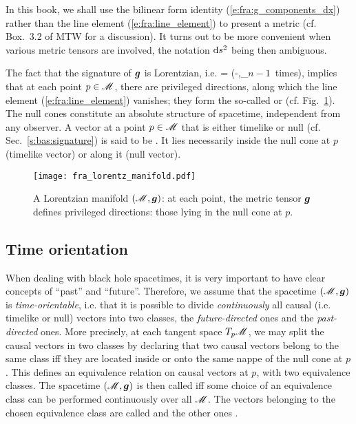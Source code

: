 \begin{remark}
In this book, we shall use the bilinear form identity (\ref{e:fra:g_components_dx}) rather than
the line element (\ref{e:fra:line_element}) to present a metric (cf. Box.~3.2 of MTW \cite{MisneTW73}
for a discussion). It turns out to be more convenient when various metric tensors are
involved, the notation $\mathrm{d} s^2$ being then ambiguous.
\end{remark}

The fact that the signature of $\bm{g}$ is Lorentzian, i.e.
\be
{}\;  = (-,\underbrace{+,\ldots,+}_{\mbox{\small $n-1$ times}}),
\ee
implies that at each point $p\in\mathscr{M}$, there are privileged directions,
along which the line element (\ref{e:fra:line_element}) vanishes; they
form the so-called 
or  (cf. Fig.~\ref{f:fra:lorentz_manifold}).
The null cones constitute an absolute structure of spacetime, independent from any observer.
A vector at a point $p\in\mathscr{M}$ that is either timelike or null
(cf. Sec.~\ref{s:bas:signature})
is said to be .
It lies necessarily inside the null cone at $p$ (timelike vector) or along it (null vector).

\begin{figure}
\centerline{\texttt{[image: fra\_lorentz\_manifold.pdf]}}
\caption[]{\label{f:fra:lorentz_manifold} \footnotesize
A Lorentzian manifold $(\mathscr{M},\bm{g})$: at each point, the metric tensor $\bm{g}$
defines privileged directions: those lying in the null cone at $p$.}
\end{figure}

\subsection{Time orientation} \label{s:fra:time_orientation}

When dealing with black hole spacetimes, it is very important to have clear
concepts of ``past'' and ``future''. Therefore, we assume
that the spacetime $(\mathscr{M}, \bm{g})$ is \emph{time-orientable}, i.e. that it is possible to divide \emph{continuously} all causal (i.e. timelike or null) vectors into
two classes, the \emph{future-directed} ones and the \emph{past-directed} ones.
More precisely, at each tangent space $T_p\mathscr{M}$, we may split the causal
vectors in two classes by declaring that two causal
vectors belong to the same class iff they are located inside
or onto the same nappe of the null cone at $p$. This defines an equivalence
relation on causal vectors at $p$, with two equivalence classes. The spacetime
$(\mathscr{M},\bm{g})$ is then called  iff some choice of an equivalence class
can be performed continuously over all $\mathscr{M}$.
The vectors belonging to the chosen equivalence class are called
 and the other ones
.

